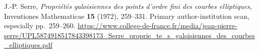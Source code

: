 J.-P. Serre, \emph{Propri\'et\'es galoisiennes des points d'ordre fini
des courbes elliptiques}, Inventiones Mathematicae \textbf{15} (1972),
259--331. Primary author-institution scan, especially pp.~259--260.
\url{https://www.college-de-france.fr/media/jean-pierre-serre/UPL5874918517843398173_Serre_proprie_te_s_galoisiennes_des_courbes_elliptiques.pdf}
